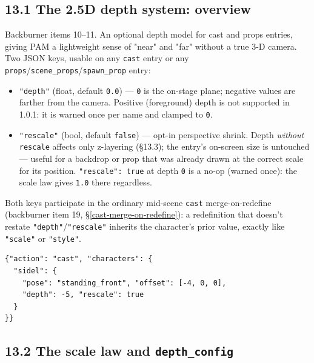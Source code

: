\documentclass[
  12pt,
  letterpaper,
]{book}
\begin{document}
\subsection{\texorpdfstring{13.1 The 2.5D depth system: overview}{13.1 The 2.5D depth system: overview}}\label{the-2-5d-depth-system-overview}

Backburner items 10--11. An optional depth model for cast and props
entries, giving PAM a lightweight sense of "near" and "far" without a
true 3-D camera. Two JSON keys, usable on any \texttt{cast} entry or
any \texttt{props}/\texttt{scene\_props}/\texttt{spawn\_prop} entry:

\begin{itemize}
\item
  \texttt{"depth"} (float, default \texttt{0.0}) --- \texttt{0} is the
  on-stage plane; negative values are farther from the camera.
  Positive (foreground) depth is not supported in 1.0.1: it is warned
  once per name and clamped to \texttt{0}.
\item
  \texttt{"rescale"} (bool, default \texttt{false}) --- opt-in
  perspective shrink. Depth \emph{without} \texttt{rescale} affects
  only z-layering (\S13.3); the entry's on-screen size is untouched ---
  useful for a backdrop or prop that was already drawn at the correct
  scale for its position. \texttt{"rescale": true} at depth \texttt{0}
  is a no-op (warned once): the scale law gives \texttt{1.0} there
  regardless.
\end{itemize}

Both keys participate in the ordinary mid-scene \texttt{cast}
merge-on-redefine (backburner item 19,
\S\ref{cast-merge-on-redefine}): a redefinition
that doesn't restate \texttt{"depth"}/\texttt{"rescale"} inherits the
character's prior value, exactly like \texttt{"scale"} or
\texttt{"style"}.

\begin{verbatim}
{"action": "cast", "characters": {
  "sidel": {
    "pose": "standing_front", "offset": [-4, 0, 0],
    "depth": -5, "rescale": true
  }
}}
\end{verbatim}

\subsection{\texorpdfstring{13.2 The scale law and \texttt{depth\_config}}{13.2 The scale law and depth\_config}}\label{the-scale-law-and-depth-config}
\end{document}
